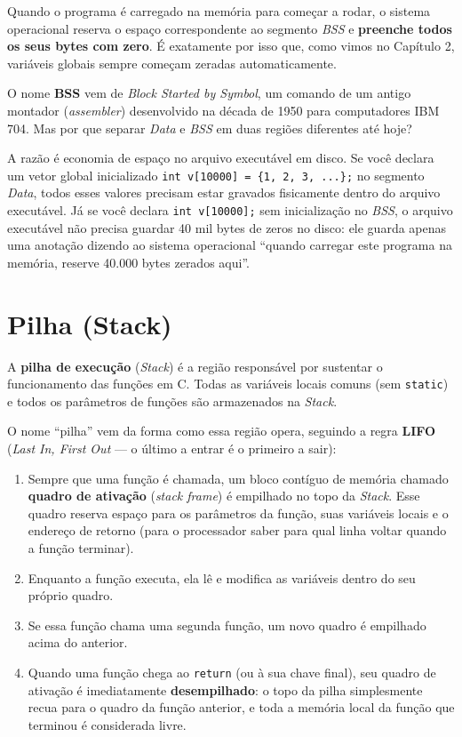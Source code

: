 Quando o programa é carregado na memória para começar a rodar, o sistema operacional reserva o espaço correspondente ao segmento \textit{BSS} e \textbf{preenche todos os seus bytes com zero}. É exatamente por isso que, como vimos no Capítulo 2, variáveis globais sempre começam zeradas automaticamente.

\begin{curiosidade}
O nome \textbf{BSS} vem de \textit{Block Started by Symbol}, um comando de um antigo montador (\textit{assembler}) desenvolvido na década de 1950 para computadores IBM 704. Mas por que separar \textit{Data} e \textit{BSS} em duas regiões diferentes até hoje?

A razão é economia de espaço no arquivo executável em disco. Se você declara um vetor global inicializado \texttt{int v[10000] = \{1, 2, 3, ...\};} no segmento \textit{Data}, todos esses valores precisam estar gravados fisicamente dentro do arquivo executável. Já se você declara \texttt{int v[10000];} sem inicialização no \textit{BSS}, o arquivo executável não precisa guardar 40 mil bytes de zeros no disco: ele guarda apenas uma anotação dizendo ao sistema operacional ``quando carregar este programa na memória, reserve 40.000 bytes zerados aqui''.
\end{curiosidade}

\section{Pilha (Stack)}
\label{sec:segmento-stack}

A \textbf{pilha de execução} (\textit{Stack}) é a região responsável por sustentar o funcionamento das funções em C. Todas as variáveis locais comuns (sem \texttt{static}) e todos os parâmetros de funções são armazenados na \textit{Stack}.

O nome ``pilha'' vem da forma como essa região opera, seguindo a regra \textbf{LIFO} (\textit{Last In, First Out} — o último a entrar é o primeiro a sair):

\begin{enumerate}
    \item Sempre que uma função é chamada, um bloco contíguo de memória chamado \textbf{quadro de ativação} (\textit{stack frame}) é empilhado no topo da \textit{Stack}. Esse quadro reserva espaço para os parâmetros da função, suas variáveis locais e o endereço de retorno (para o processador saber para qual linha voltar quando a função terminar).
    \item Enquanto a função executa, ela lê e modifica as variáveis dentro do seu próprio quadro.
    \item Se essa função chama uma segunda função, um novo quadro é empilhado acima do anterior.
    \item Quando uma função chega ao \texttt{return} (ou à sua chave final), seu quadro de ativação é imediatamente \textbf{desempilhado}: o topo da pilha simplesmente recua para o quadro da função anterior, e toda a memória local da função que terminou é considerada livre.
\end{enumerate}

